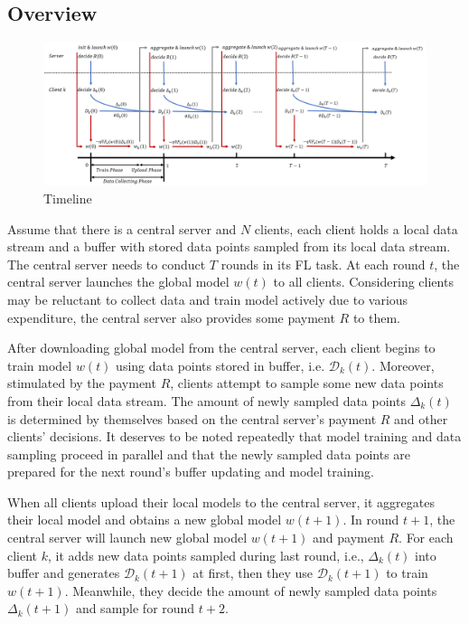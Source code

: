 \documentclass{article}
\theoremstyle{plain}
\theoremstyle{definition}
\theoremstyle{remark}
\begin{document}
\subsection{Overview}
\begin{figure}[ht]
  \centering
  \includegraphics[width=\columnwidth]{figures/figure_17.png}
  \caption{Timeline}
\end{figure}
Assume that there is a central server and $N$ clients, each client holds a local data stream and a buffer with stored data points sampled from its local data stream. 
The central server needs to conduct $T$ rounds in its FL task. 
At each round $t$, the central server launches the global model $w(t)$ to all clients.
Considering clients may be reluctant to collect data and train model actively due to various expenditure, the central server also provides some payment $R$ to them.

After downloading global model from the central server, each client begins to train model $w(t)$ using data points stored in buffer, i.e. $\mathcal{D}_k(t)$. 
Moreover, stimulated by the payment $R$, clients attempt to sample some new data points from their local data stream.
The amount of newly sampled data points $\Delta_k(t)$ is determined by themselves based on the central server's payment $R$ and other clients' decisions.
It deserves to be noted repeatedly that model training and data sampling proceed in parallel and that the newly sampled data points are prepared for the next round's buffer updating and model training.

When all clients upload their local models to the central server, it aggregates their local model and obtains a new global model $w(t+1)$.
In round $t + 1$, the central server will launch new global model $w(t+1)$ and payment $R$. For each client $k$, it adds new data points sampled during last round, i.e., $\Delta_k(t)$ into buffer and generates $\mathcal{D}_k(t+1)$ at first, then they use $\mathcal{D}_k(t+1)$ to train $w(t+1)$. 
Meanwhile, they decide the amount of newly sampled data points $\Delta_k(t+1)$ and sample for round $t+2$. 
\end{document}
